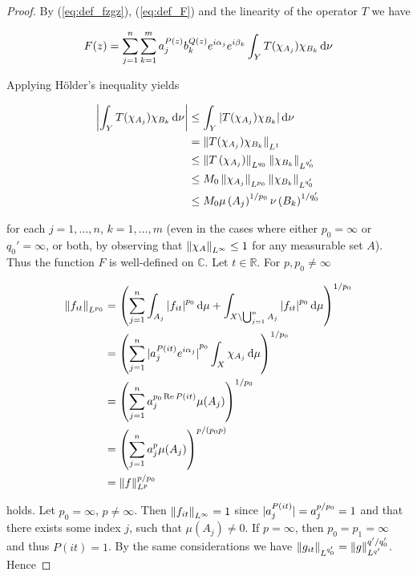 \begin{proof}
By (\ref{eq:def_fzgz}), (\ref{eq:def_F}) and the linearity of the operator $T$ we have

\begin{gather*}
	F(z) = \sum_{j = 1}^n\sum_{k = 1}^m a^{P(z)}_j b_k^{Q(z)} e^{i\alpha_j} e^{i\beta_k} \int_YT(\chi_{A_j})\chi_{B_k}\mathop{}\!\mathrm{d}\nu
\end{gather*}

Applying H\"older's inequality yields

\begin{equation}
	\begin{aligned}
		\abs{ \int_YT(\chi_{A_j})\chi_{B_k}\d\nu} &\leq \int_Y\abs[0]{ T(\chi_{A_j})\chi_{B_k}}\d\nu\\
		&= \norm[0]{T(\chi_{A_j})\chi_{B_k}}_{L^1}\\
		&\leq \norm[0]{T\del[0]{\chi_{A_j}}}_{L^{q_0}} \norm[0]{\chi_{B_k}}_{L^{q_0'}}\\
		&\leq M_0\norm[0]{\chi_{A_j}}_{L^{p_0}} \norm[0]{\chi_{B_k}}_{L^{q_0'}}\\
		&\leq M_0 \mu\del[0]{A_j}^{1/p_0}\nu\del[0]{B_k}^{1/q_0'}
		\label{est:constant_F}		
	\end{aligned}
\end{equation}

\noindent for each $j = 1,\hdots,n$, $k = 1,\hdots,m$ (even in the cases where either $p_0 = \infty$ or $q_0' = \infty$, or both, by observing that $\norm[0]{ \chi_{A}}_{L^\infty} \leq 1$ for any measurable set $A$). Thus the function $F$ is well-defined on $\mathbb{C}$. Let $t \in \mathbb{R}$. For $p,p_0 \neq \infty$

\begin{gather*}
	\begin{aligned}
		\norm[0]{f_{it}}_{L^{p_0}} &= \left(\sum_{j = 1}^n \int_{A_j} \abs[0]{ f_{it}}^{p_0} \d\mu + \int_{X \setminus \bigcup_{j = 1}^n A_j} \abs[0]{ f_{it} }^{p_0} \d\mu\right)^{1/p_0}\\
		&= \del{\sum_{j = 1}^n \abs[0]{ a_j^{P(it)} e^{i\alpha_j}}^{p_0}\int_X \chi_{A_j} \d\mu}^{1/p_0}\\
		&= \del{\sum_{j = 1}^n a_j^{p_0\Re P(it)}\mu(A_j)}^{1/p_0}\\
		&= \del{\sum_{j = 1}^n a_j^p\mu(A_j)}^{p/\left(p_0p\right)}\\
		&= \norm[0]{f}_{L^p}^{p/p_0} 
	\end{aligned}
\end{gather*}

\noindent holds. Let $p_0 = \infty$, $p \neq \infty$. Then $\norm[0]{f_{it}}_{L^{\infty}} = 1$ since $\abs[0]{ a_j^{P(it)}} = a_j^{p/p_0} = 1$ and that there exists some index $j$, such that $\mu( A_j) \neq 0$. If $p = \infty$, then $p_0 = p_1 = \infty$ and thus $P(it) = 1$. By the same considerations we have $\norm[0]{g_{it}}_{L^{q_0'}} = \norm[0]{g}_{L^{q'}}^{q'/q'_0}$. Hence


\end{proof}
